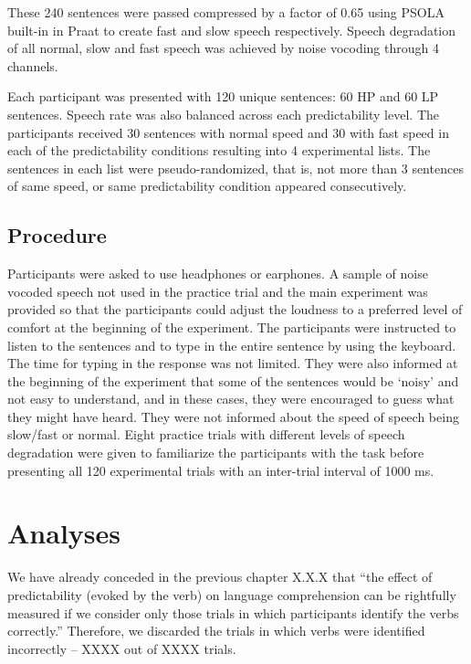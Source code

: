 \documentclass[a4paper, nobind]{templates/ociamthesis}
\begin{document}
These 240 sentences were passed compressed by a factor of 0.65 using PSOLA built-in in Praat to create fast and slow speech respectively.
Speech degradation of all normal, slow and fast speech was achieved by noise vocoding through 4 channels.

Each participant was presented with 120 unique sentences: 60 HP and 60 LP sentences.
Speech rate was also balanced across each predictability level.
The participants received 30 sentences with normal speed and 30 with fast speed in each of the predictability conditions resulting into 4 experimental lists.
The sentences in each list were pseudo-randomized, that is, not more than 3 sentences of same speed, or same predictability condition appeared consecutively.

\hypertarget{procedure-3}{%
\subsection{Procedure}\label{procedure-3}}

Participants were asked to use headphones or earphones.
A sample of noise vocoded speech not used in the practice trial and the main experiment was provided so that the participants could adjust the loudness to a preferred level of comfort at the beginning of the experiment.
The participants were instructed to listen to the sentences and to type in the entire sentence by using the keyboard.
The time for typing in the response was not limited.
They were also informed at the beginning of the experiment that some of the sentences would be `noisy' and not easy to understand, and in these cases, they were encouraged to guess what they might have heard.
They were not informed about the speed of speech being slow/fast or normal.
Eight practice trials with different levels of speech degradation were given to familiarize the participants with the task before presenting all 120 experimental trials with an inter-trial interval of 1000 ms.

\hypertarget{analyses-3}{%
\section{Analyses}\label{analyses-3}}

We have already conceded in the previous chapter X.X.X that ``the effect of predictability (evoked by the verb) on language comprehension can be rightfully measured if we consider only those trials in which participants identify the verbs correctly.''
Therefore, we discarded the trials in which verbs were identified incorrectly -- XXXX out of XXXX trials.
\end{document}
